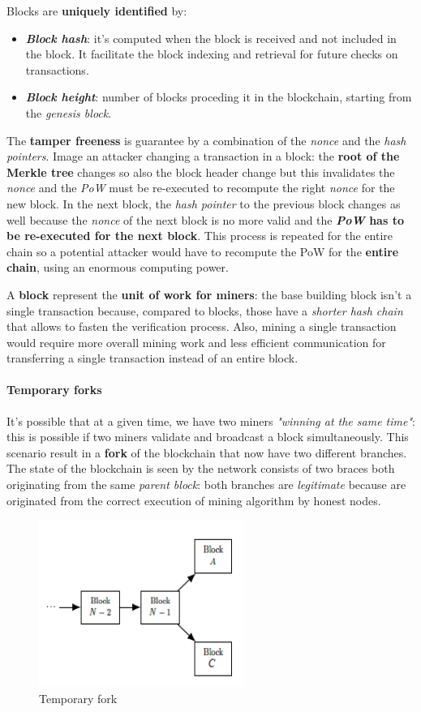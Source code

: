 \documentclass[10pt,a4paper]{report}
\begin{document}
Blocks are \textbf{uniquely identified} by:
\begin{itemize}
	\item 
	\textit{\textbf{Block hash}}: it's computed when the block is received and not included in the block. It facilitate the block indexing and retrieval for future checks on transactions.
	\item 
	\textit{\textbf{Block height}}: number of blocks proceding it in the blockchain, starting from the \textit{genesis block}.
\end{itemize}

The \textbf{tamper freeness} is guarantee by a combination of the \textit{nonce} and the \textit{hash pointers}. Image an attacker changing a transaction in a block: the \textbf{root of the Merkle tree} changes so also the block header change but this invalidates the \textit{nonce} and the \textit{PoW} must be re-executed to recompute the right \textit{nonce} for the new block.
In the next block, the \textit{hash pointer} to the previous block changes as well because the \textit{nonce} of the next block is no more valid and the \textbf{\textit{PoW} has to be re-executed for the next block}.  This process is repeated for the entire chain so a potential attacker would have to recompute the PoW for the \textbf{entire chain}, using an enormous computing power.

A \textbf{block} represent the \textbf{unit of work for miners}: the base building block isn't a single transaction because, compared to blocks, those have a \textit{shorter hash chain} that allows to fasten the verification process. Also, mining a single transaction would require more overall mining work and less efficient communication for transferring a single transaction instead of an entire block.
\paragraph{Temporary forks}\label{sec:temporary-forks}
It's possible that at a given time, we have two miners \textit{"winning at the same time"}: this is possible if two miners validate and broadcast a block simultaneously. This scenario result in a \textbf{fork} of the blockchain that now have two different branches. The state of the blockchain is seen by the network consists of two braces both originating from the same \textit{parent block}: both branches are \textit{legitimate} because are originated from the correct execution of mining algorithm by honest nodes.

\begin{figure}[h]
	\centering
	\includegraphics[scale=0.50]{images/Pasted image 20230411104811.png}
	\caption{Temporary fork}
\end{figure}
\end{document}
